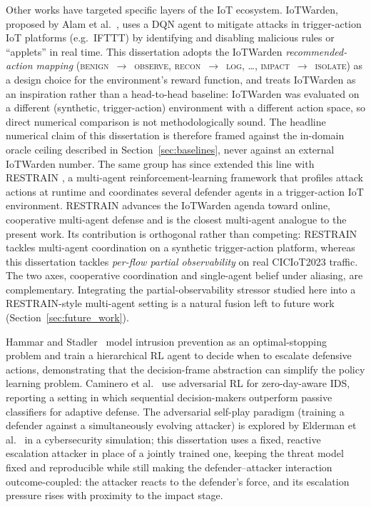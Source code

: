 Other works have targeted specific layers of the IoT ecosystem. IoTWarden, proposed by Alam et al.\ \cite{Alam2024}, uses a DQN agent to mitigate attacks in trigger-action IoT platforms (e.g.\ IFTTT) by identifying and disabling malicious rules or ``applets'' in real time. This dissertation adopts the IoTWarden \emph{recommended-action mapping} (\textsc{benign}~$\to$~\textsc{observe}, \textsc{recon}~$\to$~\textsc{log}, \ldots, \textsc{impact}~$\to$~\textsc{isolate}) as a design choice for the environment's reward function, and treats IoTWarden as an inspiration rather than a head-to-head baseline: IoTWarden was evaluated on a different (synthetic, trigger-action) environment with a different action space, so direct numerical comparison is not methodologically sound. The headline numerical claim of this dissertation is therefore framed against the in-domain oracle ceiling described in Section~\ref{sec:baselines}, never against an external IoTWarden number. The same group has since extended this line with RESTRAIN \cite{Alam2025}, a multi-agent reinforcement-learning framework that profiles attack actions at runtime and coordinates several defender agents in a trigger-action IoT environment. RESTRAIN advances the IoTWarden agenda toward online, cooperative multi-agent defense and is the closest multi-agent analogue to the present work. Its contribution is orthogonal rather than competing: RESTRAIN tackles multi-agent coordination on a synthetic trigger-action platform, whereas this dissertation tackles \emph{per-flow partial observability} on real CICIoT2023 traffic. The two axes, cooperative coordination and single-agent belief under aliasing, are complementary. Integrating the partial-observability stressor studied here into a RESTRAIN-style multi-agent setting is a natural fusion left to future work (Section~\ref{sec:future_work}).

Hammar and Stadler~\cite{Hammar2022} model intrusion prevention as an optimal-stopping problem and train a hierarchical RL agent to decide when to escalate defensive actions, demonstrating that the decision-frame abstraction can simplify the policy learning problem. Caminero et al.~\cite{Caminero2019} use adversarial RL for zero-day-aware IDS, reporting a setting in which sequential decision-makers outperform passive classifiers for adaptive defense. The adversarial self-play paradigm (training a defender against a simultaneously evolving attacker) is explored by Elderman et al.~\cite{Elderman2017} in a cybersecurity simulation; this dissertation uses a fixed, reactive escalation attacker in place of a jointly trained one, keeping the threat model fixed and reproducible while still making the defender--attacker interaction outcome-coupled: the attacker reacts to the defender's force, and its escalation pressure rises with proximity to the impact stage.

